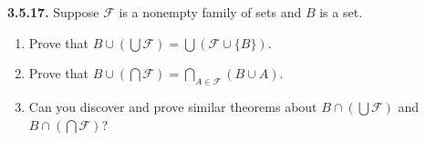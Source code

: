 \documentclass[12pt]{amsart}
\newenvironment{statement}[1]{\smallskip\noindent\color[rgb]{.6627, .3529, .6314} {\bf #1.}}{}
\theoremstyle{definition}
\theoremstyle{remark}
\begin{document}
\begin{statement}{3.5.17}
Suppose $\mathcal{F}$ is a nonempty family of sets and $B$ is a set.
\begin{enumerate}
	\item Prove that $B \cup \left( \bigcup \mathcal{F} \right) = 
	\bigcup (\mathcal{F} \cup \{ B \})$.
	
	\item Prove that $B \cup \left( \bigcap \mathcal{F} \right) = 
	\bigcap_{A \in \mathcal{F}} (B \cup A)$.
	
	\item Can you discover and prove similar theorems about 
	$B \cap \left( \bigcup \mathcal{F} \right)$ and
	$B \cap \left( \bigcap \mathcal{F} \right)$?
\end{enumerate}
\end{statement}
\end{document}
